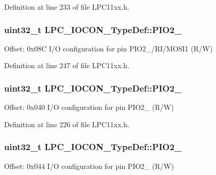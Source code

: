 Definition at line 233 of file L\+P\+C11xx.\+h.

\subsubsection[{\texorpdfstring{P\+I\+O2\+\_\+3}{PIO2_3}}]{ uint32\+\_\+t L\+P\+C\+\_\+\+I\+O\+C\+O\+N\+\_\+\+Type\+Def\+::\+P\+I\+O2\+\_}\hypertarget{group___l_p_c11xx___definitions_ga39ffc992bab7191884f1a926743ffdf5}{}\label{group___l_p_c11xx___definitions_ga39ffc992bab7191884f1a926743ffdf5}
Offset\+: 0x08C I/O configuration for pin P\+I\+O2\+\_/\+R\+I/\+M\+O\+S\+I1 (R/W) 

Definition at line 247 of file L\+P\+C11xx.\+h.

\subsubsection[{\texorpdfstring{P\+I\+O2\+\_\+4}{PIO2_4}}]{ uint32\+\_\+t L\+P\+C\+\_\+\+I\+O\+C\+O\+N\+\_\+\+Type\+Def\+::\+P\+I\+O2\+\_}\hypertarget{group___l_p_c11xx___definitions_ga740326ac07f023dc92db7f585e6ad407}{}\label{group___l_p_c11xx___definitions_ga740326ac07f023dc92db7f585e6ad407}
Offset\+: 0x040 I/O configuration for pin P\+I\+O2\+\_ (R/W) 

Definition at line 226 of file L\+P\+C11xx.\+h.

\subsubsection[{\texorpdfstring{P\+I\+O2\+\_\+5}{PIO2_5}}]{ uint32\+\_\+t L\+P\+C\+\_\+\+I\+O\+C\+O\+N\+\_\+\+Type\+Def\+::\+P\+I\+O2\+\_}\hypertarget{group___l_p_c11xx___definitions_gade2f9afaefeff5ab5dd1fbc04f968b34}{}\label{group___l_p_c11xx___definitions_gade2f9afaefeff5ab5dd1fbc04f968b34}
Offset\+: 0x044 I/O configuration for pin P\+I\+O2\+\_ (R/W) 

